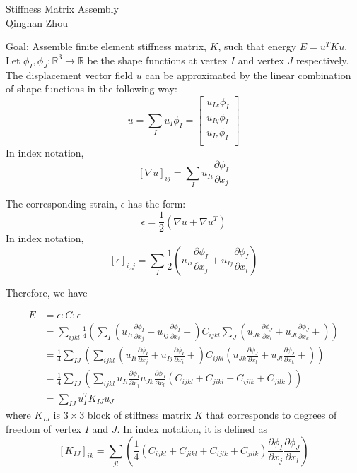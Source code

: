 \documentclass[12pt,letter]{article}
\renewcommand{\Re}{\ensuremath{\mathbb{R}}}
\begin{document}
\begin{center}
Stiffness Matrix Assembly\\
Qingnan Zhou
\end{center}
\vspace{0.2in}
Goal: Assemble finite element stiffness matrix, $K$, such that energy $E = u^T K u$.\\

Let $\phi_I, \phi_J : \Re^3 \rightarrow \Re$ be the shape functions at vertex
$I$ and vertex $J$ respectively.  The displacement vector field $u$ can be
approximated by the linear combination of shape functions in the following way:
$$
u = \sum_{I} u_I \phi_I = \left[
\begin{array}{c}
u_{Ix} \phi_I \\
u_{Iy} \phi_I \\
u_{Iz} \phi_I \\
\end{array}
\right]
$$
In index notation,
$$
[\nabla u]_{ij} = \sum_{I} u_{Ii} \frac{\partial \phi_I}{\partial x_j}
$$

The corresponding strain, $\epsilon$ has the form:
$$
\epsilon = \frac{1}{2} (\nabla u + \nabla u^T)
$$
In index notation,
$$
[\epsilon]_{i,j} = \sum_{I} \frac{1}{2} \left(u_{Ii} \frac{\partial \phi_I}{\partial x_j} +
u_{Ij} \frac{\partial \phi_I}{\partial x_i}\right)
$$

Therefore, we have

\begin{align*}
E &= \epsilon : C : \epsilon \\
  &= \sum_{ijkl} \frac{1}{4} \left( \sum_{I} \left(
  u_{Ii} \frac{\partial \phi_I}{\partial x_j} +
  u_{Ij} \frac{\partial \phi_I}{\partial x_i} +
  \right)
  C_{ijkl}
  \sum_{J} \left(
  u_{Jk} \frac{\partial \phi_J}{\partial x_l} +
  u_{Jl} \frac{\partial \phi_J}{\partial x_k} +
  \right)
  \right)\\
  &= \frac{1}{4} \sum_{IJ} \left( \sum_{ijkl} \left(
  u_{Ii} \frac{\partial \phi_I}{\partial x_j} +
  u_{Ij} \frac{\partial \phi_I}{\partial x_i} +
  \right)
  C_{ijkl}
  \left(
  u_{Jk} \frac{\partial \phi_J}{\partial x_l} +
  u_{Jl} \frac{\partial \phi_J}{\partial x_k} +
  \right)
  \right)\\
  &= \frac{1}{4} \sum_{IJ} \left( \sum_{ijkl}
  u_{Ii} \frac{\partial \phi_I}{\partial x_j}
  u_{Jk} \frac{\partial \phi_J}{\partial x_l}
  \left(
  C_{ijkl} + C_{jikl} + C_{ijlk} + C_{jilk}
  \right)
  \right)\\
  &= \sum_{IJ} u_I^T K_{IJ} u_J
\end{align*}
where $K_{IJ}$ is $3 \times 3$ block of stiffness matrix $K$ that corresponds to
degrees of freedom of vertex $I$ and $J$.  In index notation, it is defined as
$$
[K_{IJ}]_{ik} = \sum_{jl} \left(\frac{1}{4}
( C_{ijkl} + C_{jikl} + C_{ijlk} + C_{jilk} )
\frac{\partial \phi_I}{\partial x_j} \frac{\partial \phi_J}{\partial x_l}
\right)
$$
\end{document}
